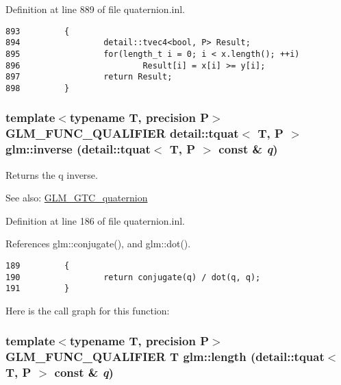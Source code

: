 Definition at line 889 of file quaternion.inl.

\begin{Code}\begin{verbatim}893         {
894                 detail::tvec4<bool, P> Result;
895                 for(length_t i = 0; i < x.length(); ++i)
896                         Result[i] = x[i] >= y[i];
897                 return Result;
898         }
\end{verbatim}
\end{Code}


\hypertarget{group__gtc__quaternion_g105dc7d1f84cc6cf4ba6e3634c671688}{
\subsubsection[inverse]{\setlength{\rightskip}{0pt plus 5cm}template$<$typename T, precision P$>$ GLM\_\-FUNC\_\-QUALIFIER detail::tquat$<$ T, P $>$ glm::inverse (detail::tquat$<$ T, P $>$ const \& {\em q})}}
\label{group__gtc__quaternion_g105dc7d1f84cc6cf4ba6e3634c671688}


Returns the q inverse.

\begin{Desc}
\item[See also:]\hyperlink{group__gtc__quaternion}{GLM\_\-GTC\_\-quaternion} \end{Desc}


Definition at line 186 of file quaternion.inl.

References glm::conjugate(), and glm::dot().

\begin{Code}\begin{verbatim}189         {
190                 return conjugate(q) / dot(q, q);
191         }
\end{verbatim}
\end{Code}




Here is the call graph for this function:\hypertarget{group__gtc__quaternion_g286560b01bedb4e046ffb71de22464f4}{
\subsubsection[length]{\setlength{\rightskip}{0pt plus 5cm}template$<$typename T, precision P$>$ GLM\_\-FUNC\_\-QUALIFIER T glm::length (detail::tquat$<$ T, P $>$ const \& {\em q})}}
\label{group__gtc__quaternion_g286560b01bedb4e046ffb71de22464f4}


